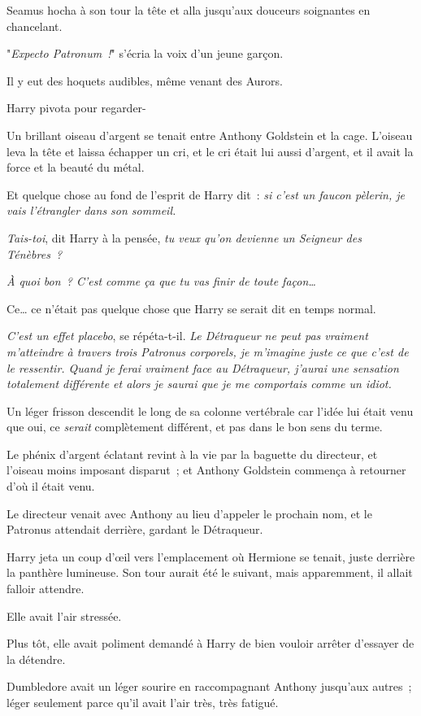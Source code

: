 Seamus hocha à son tour la tête et alla jusqu'aux douceurs soignantes en chancelant.

"\emph{Expecto Patronum~!}" s'écria la voix d'un jeune garçon.

Il y eut des hoquets audibles, même venant des Aurors.

Harry pivota pour regarder-

Un brillant oiseau d'argent se tenait entre Anthony Goldstein et la cage. L'oiseau leva la tête et laissa échapper un cri, et le cri était lui aussi d'argent, et il avait la force et la beauté du métal.

Et quelque chose au fond de l'esprit de Harry dit~: \emph{si c'est un faucon pèlerin, je vais l'étrangler dans son sommeil.}

\emph{Tais-toi}, dit Harry à la pensée, \emph{tu veux qu'on devienne un Seigneur des Ténèbres~?}

\emph{À quoi bon~? C'est comme ça que tu vas finir de toute façon…}

Ce… ce n'était pas quelque chose que Harry se serait dit en temps normal.

\emph{C'est un effet placebo}, se répéta-t-il. \emph{Le Détraqueur ne peut pas vraiment m'atteindre à travers trois Patronus corporels, je m'imagine juste ce que c'est de le ressentir. Quand je ferai vraiment face au Détraqueur, j'aurai une sensation totalement différente et alors je saurai que je me comportais comme un idiot.}

Un léger frisson descendit le long de sa colonne vertébrale car l'idée lui était venu que oui, ce \emph{serait} complètement différent, et pas dans le bon sens du terme.

Le phénix d'argent éclatant revint à la vie par la baguette du directeur, et l'oiseau moins imposant disparut~; et Anthony Goldstein commença à retourner d'où il était venu.

Le directeur venait avec Anthony au lieu d'appeler le prochain nom, et le Patronus attendait derrière, gardant le Détraqueur.

Harry jeta un coup d'œil vers l'emplacement où Hermione se tenait, juste derrière la panthère lumineuse. Son tour aurait été le suivant, mais apparemment, il allait falloir attendre.

Elle avait l'air stressée.

Plus tôt, elle avait poliment demandé à Harry de bien vouloir arrêter d'essayer de la détendre.

Dumbledore avait un léger sourire en raccompagnant Anthony jusqu'aux autres~; léger seulement parce qu'il avait l'air très, très fatigué.

